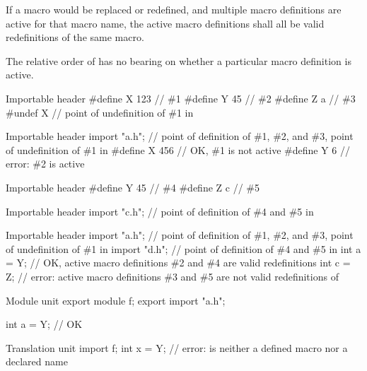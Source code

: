 \pnum
If a macro would be replaced or redefined, and multiple macro definitions
are active for that macro name, the active macro definitions shall all be
valid redefinitions of the same macro.
\begin{note}
The relative order of  has no bearing on whether a
particular macro definition is active.
\end{note}

\pnum
\begin{example}
\begin{codeblocktu}{Importable header }
#define X 123   // \#1
#define Y 45    // \#2
#define Z a     // \#3
#undef X        // point of undefinition of \#1 in 
\end{codeblocktu}

\begin{codeblocktu}{Importable header }
import "a.h";   // point of definition of \#1, \#2, and \#3, point of undefinition of \#1 in 
#define X 456   // OK, \#1 is not active
#define Y 6     // error: \#2 is active
\end{codeblocktu}

\begin{codeblocktu}{Importable header }
#define Y 45    // \#4
#define Z c     // \#5
\end{codeblocktu}

\begin{codeblocktu}{Importable header }
import "c.h";   // point of definition of \#4 and \#5 in 
\end{codeblocktu}

\begin{codeblocktu}{Importable header }
import "a.h";   // point of definition of \#1, \#2, and \#3, point of undefinition of \#1 in 
import "d.h";   // point of definition of \#4 and \#5 in 
int a = Y;      // OK, active macro definitions \#2 and \#4 are valid redefinitions
int c = Z;      // error: active macro definitions \#3 and \#5 are not valid redefinitions of 
\end{codeblocktu}

\begin{codeblocktu}{Module unit }
export module f;
export import "a.h";

int a = Y;      // OK
\end{codeblocktu}

\begin{codeblocktu}{Translation unit }
import f;
int x = Y;      // error:  is neither a defined macro nor a declared name
\end{codeblocktu}
\end{example}

